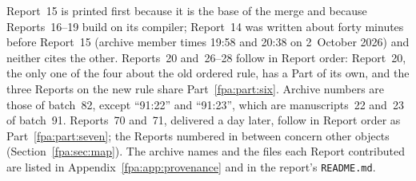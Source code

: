 \documentclass[11pt,a4paper]{article}
\numberwithin{equation}{section}
\begin{document}
Report~15 is printed first because it is the base of the merge and because Reports~16--19 build on its compiler; Report~14 was written about forty minutes before Report~15 (archive member times 19:58 and 20:38 on 2~October 2026) and neither cites the other. Reports~20 and~26--28 follow in Report order: Report~20, the only one of the four about the old ordered rule, has a Part of its own, and the three Reports on the new rule share Part~\ref{fpa:part:six}. Archive numbers are those of batch~82, except ``91:22'' and ``91:23'', which are manuscripts~22 and~23 of batch~91. Reports~70 and~71, delivered a day later, follow in Report order as Part~\ref{fpa:part:seven}; the Reports numbered in between concern other objects (Section~\ref{fpa:sec:map}). The archive names and the files each Report contributed are listed in Appendix~\ref{fpa:app:provenance} and in the report's \texttt{README.md}.
\end{document}
